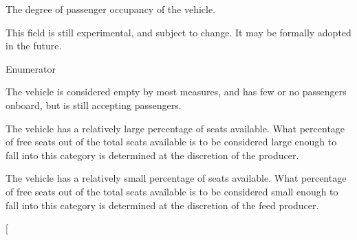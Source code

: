 The degree of passenger occupancy of the vehicle. 

This field is still experimental, and subject to change. It may be formally adopted in the future. \begin{Desc}
\item[Enumerator]\par
\begin{description}
\item[{\em 
E\+M\+P\+TY\hypertarget{structVehiclePosition_a3b7e3ee1e916599ecb7fd088d4f53f0da87a5c81df0fd6b1539bacec16fc4c6b5}{}\label{structVehiclePosition_a3b7e3ee1e916599ecb7fd088d4f53f0da87a5c81df0fd6b1539bacec16fc4c6b5}
}]The vehicle is considered empty by most measures, and has few or no passengers onboard, but is still accepting passengers. \item[{\em 
M\+A\+N\+Y\+\_\+\+S\+E\+A\+T\+S\+\_\+\+A\+V\+A\+I\+L\+A\+B\+LE\hypertarget{structVehiclePosition_a3b7e3ee1e916599ecb7fd088d4f53f0daf47c028fa64a8263faf6e053d0f43386}{}\label{structVehiclePosition_a3b7e3ee1e916599ecb7fd088d4f53f0daf47c028fa64a8263faf6e053d0f43386}
}]The vehicle has a relatively large percentage of seats available. What percentage of free seats out of the total seats available is to be considered large enough to fall into this category is determined at the discretion of the producer. \item[{\em 
F\+E\+W\+\_\+\+S\+E\+A\+T\+S\+\_\+\+A\+V\+A\+I\+L\+A\+B\+LE\hypertarget{structVehiclePosition_a3b7e3ee1e916599ecb7fd088d4f53f0da0a86e1ce880abf48e47b46edc1c57723}{}\label{structVehiclePosition_a3b7e3ee1e916599ecb7fd088d4f53f0da0a86e1ce880abf48e47b46edc1c57723}
}]The vehicle has a relatively small percentage of seats available. What percentage of free seats out of the total seats available is to be considered small enough to fall into this category is determined at the discretion of the feed producer. \item[{\em 
}
\end{description}
\end{Desc}

